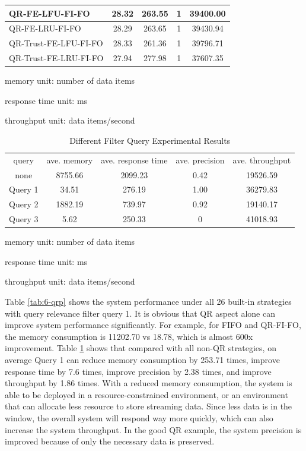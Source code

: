 \begin{table}[!htbp]
\begin{tabular}{|l||c|c|c|c|}
QR-FE-LFU-FI-FO      & 28.32 & 263.55 & 1 & 39400.00\\ \hline 
QR-FE-LRU-FI-FO      & 28.29 & 263.65 & 1 & 39430.94\\ \hline 
QR-Trust-FE-LFU-FI-FO & 28.33 & 261.36 & 1 & 39796.71\\ \hline 
QR-Trust-FE-LRU-FI-FO & 27.94 & 277.98 & 1 & 37607.35\\ \hline 
    \end{tabular}
    \begin{tablenotes}
 		\item memory unit: number of data items
 		\item response time unit: ms
 		\item throughput unit: data items/second
    \end{tablenotes}
\end{table}

\begin{table}[!htbp]
	\centering
    \caption{Different Filter Query Experimental Results}
    \label{tab:6-fqqi}
    \begin{tabular}{|c||c|c|c|c|} \hline
    query & ave. memory & ave. response time & ave. precision & ave. throughput \\ \hhline{|=#=|=|=|=|}
    none & 8755.66 & 2099.23 & 0.42 & 19526.59 \\ \hline
    Query 1 & 34.51 & 276.19 & 1.00 & 36279.83\\ \hline
    Query 2 & 1882.19 & 739.97 & 0.92 & 19140.17\\ \hline
    Query 3 & 5.62 & 250.33 & 0 & 41018.93\\ \hline
    \end{tabular}
    \begin{tablenotes}
 		\item memory unit: number of data items
 		\item response time unit: ms
 		\item throughput unit: data items/second
    \end{tablenotes}
\end{table}

Table \ref{tab:6-qrp} shows the system performance under all 26 built-in strategies with query relevance filter query 1.
It is obvious that QR aspect alone can improve system performance significantly. 
For example, for FIFO and QR-FI-FO, the memory consumption is 11202.70 vs 18.78, which is almost 600x improvement. 
Table \ref{tab:6-fqqi} shows that compared with all non-QR strategies, on average Query 1 can reduce memory consumption by 253.71 times, improve response time by 7.6 times, improve precision by 2.38 times, and improve throughput by 1.86 times. 
With a reduced memory consumption, the system is able to be deployed in a resource-constrained environment, or an environment that can allocate less resource to store streaming data. 
Since less data is in the window, the overall system will respond way more quickly, which can also increase the system throughput. 
In the good QR example, the system precision is improved because of only the necessary data is preserved. 

